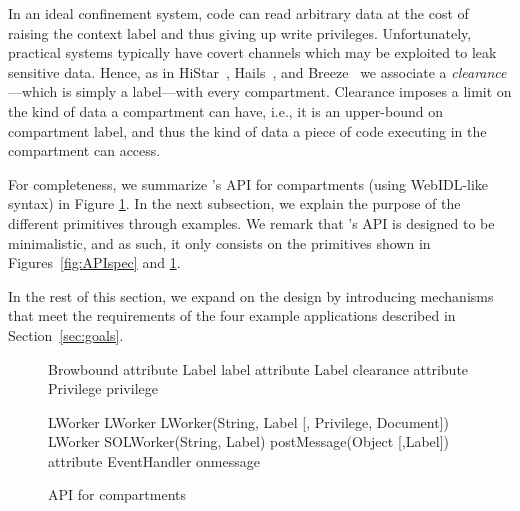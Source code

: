 In an ideal confinement system, code can read arbitrary data at the
cost of raising the context label and thus giving up write privileges.
%
Unfortunately, practical systems typically have covert channels which
may be exploited to leak sensitive data.
%
Hence, as in HiStar~\cite{Zeldovich:2006}, Hails~\cite{giffin:2012:hails}, and
Breeze~\cite{Breeze13} we associate a \emph{clearance}---which is
simply a label---with every compartment.
%
Clearance imposes a limit on the kind of data a compartment can have,
i.e., it is an upper-bound on compartment label, and thus the kind of
data a piece of code executing in the compartment can access.

For completeness, we summarize  \sys{}'s API for compartments
(using WebIDL-like syntax) in Figure \ref{systemAPI}. In the next subsection, 
we explain the purpose of the different primitives through examples. 
We remark that \sys{}'s API is designed to be minimalistic, and as such, it only
consists on the primitives shown in Figures~\ref{fig:APIspec} and
\ref{systemAPI}.

In the rest of this section, we expand on the \sys{} design by
introducing mechanisms that meet the requirements of the four
example applications described in Section~\ref{sec:goals}.
%


\begin{figure}
{\small
\begin{webidl}
Browbound {
  attribute Label label
  attribute Label clearance 
  attribute Privilege privilege
}
\end{webidl}
\begin{webidl}
LWorker {
  LWorker LWorker(String, Label
                  [, Privilege, Document])
  LWorker SOLWorker(String, Label)
  postMessage(Object [,Label])
  attribute EventHandler onmessage
}
\end{webidl}
}
\vspace{-10pt}
\caption{\label{systemAPI} API for compartments}
\vspace{-10pt}
\end{figure}


